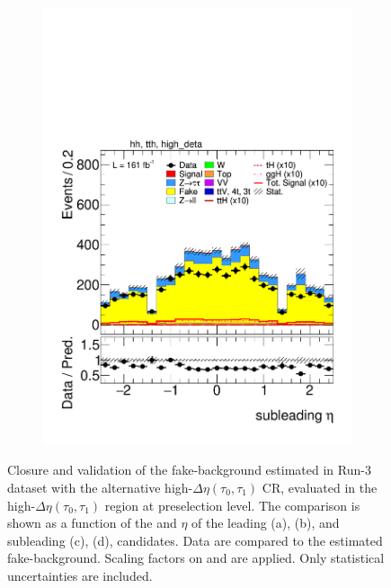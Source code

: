 \begin{figure}[htbp]
\begin{subfigure}[b]{0.45\textwidth}
        \includegraphics[width=\textwidth]{images/highdeta_highdeta_run3/plot_tau_1_eta_hh_tth_22_23_24_high_deta.pdf}
        \caption{}
      \end{subfigure}
      \caption{
    Closure and validation of the fake-\tauhad background estimated in Run-3 dataset with the alternative high-$\Delta \eta (\tau_0, \tau_1)$ \tauhadhad CR, evaluated in the high-$\Delta \eta (\tau_0, \tau_1)$ region at preselection level.
    The comparison is shown as a function of the \pt and $\eta$ of the leading (a), (b), and subleading (c), (d), \tauhad candidates. 
    Data are compared to the estimated fake-\tauhad background. Scaling factors on \ztautau and \ttbar are applied. Only statistical uncertainties are included.
  }
  \label{fig:closure_validation_highdeta_run3}
\end{figure}
      

